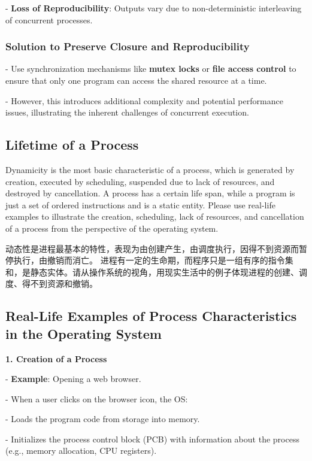\documentclass[a4paper]{book}
\begin{document}
- \textbf{Loss of Reproducibility}: Outputs vary due to non-deterministic interleaving of concurrent processes.

\subsubsection{Solution to Preserve Closure and Reproducibility}

- Use synchronization mechanisms like \textbf{mutex locks} or \textbf{file access control} to ensure that only one program can access the shared resource at a time.

- However, this introduces additional complexity and potential performance issues, illustrating the inherent challenges of concurrent execution.

\subsection{Lifetime of a Process}

\begin{greenbox}
Dynamicity is the most basic characteristic of a process, which is generated by creation, executed by scheduling, suspended due to lack of resources, and destroyed by cancellation. A process has a certain life span, while a program is just a set of ordered instructions and is a static entity. Please use real-life examples to illustrate the creation, scheduling, lack of resources, and cancellation of a process from the perspective of the operating system.
\end{greenbox}

动态性是进程最基本的特性，表现为由创建产生，由调度执行，因得不到资源而暂停执行，由撤销而消亡。 进程有一定的生命期，而程序只是一组有序的指令集和，是静态实体。请从操作系统的视角，用现实生活中的例子体现进程的创建、调度、得不到资源和撤销。

\subsection{Real-Life Examples of Process Characteristics in the Operating System}

\textbf{1. Creation of a Process}

   - \textbf{Example}: Opening a web browser.
     
     - When a user clicks on the browser icon, the OS:
       
       - Loads the program code from storage into memory.
       
       - Initializes the process control block (PCB) with information about the process (e.g., memory allocation, CPU registers).
       
\end{document}

